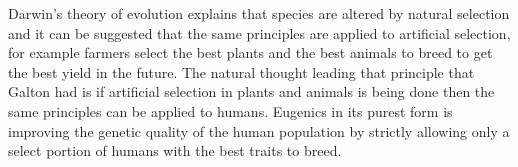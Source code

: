 \documentclass[11pt, oneside]{article}
\begin{document}


\par Darwin's theory of evolution explains that species are altered by natural selection and it can be suggested that the same principles are applied to artificial selection, for example farmers select the best plants and the best animals to breed to get the best yield in the future. The natural thought leading that principle that Galton had is if artificial selection in plants and animals is being done then the same principles can be applied to humans. Eugenics in its purest form is improving the genetic quality of the human population by strictly allowing only a select portion of humans with the best traits to breed. 
\end{document}
